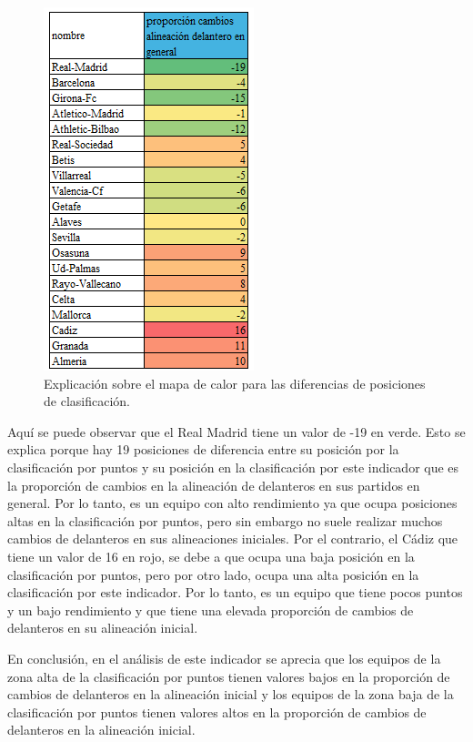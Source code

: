 \begin{figure}[H]
    \centering
    \includegraphics[scale=0.75]{svg/explicacion-tabla.png}
    \caption{Explicación sobre el mapa de calor para las diferencias de posiciones de clasificación. }
    \label{fig:explicacion-mapa}
\end{figure}



Aquí se puede observar que el Real Madrid tiene un valor de -19 en verde. Esto se explica porque 
hay 19 posiciones de diferencia entre su posición por la clasificación por puntos y su posición en 
la clasificación por este indicador que es la proporción de cambios en la alineación de delanteros 
en sus partidos en general. Por lo tanto, es un equipo con alto rendimiento ya que ocupa posiciones 
altas en la clasificación por puntos, pero sin embargo no suele realizar muchos cambios de 
delanteros en sus alineaciones iniciales. Por el contrario, el Cádiz que tiene un valor de 16 en rojo, 
se debe a que ocupa una baja posición en la clasificación por puntos, pero por otro lado, ocupa 
una alta posición en la clasificación por este indicador. Por lo tanto, es un equipo que tiene pocos 
puntos y un bajo rendimiento y que tiene una elevada proporción de cambios de delanteros en su 
alineación inicial.

En conclusión, en el análisis de este indicador se aprecia que los equipos de la zona alta de la 
clasificación por puntos tienen valores bajos en la proporción de cambios de delanteros en la 
alineación inicial y los equipos de la zona baja de la clasificación por puntos tienen valores altos 
en la proporción de cambios de delanteros en la alineación inicial.


